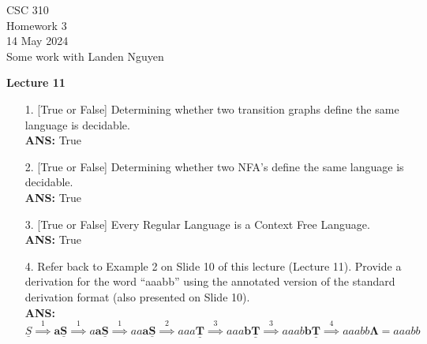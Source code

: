 \documentclass[letterpaper, 12 pt]{article}
\begin{document}
\begin{center}
    \Large CSC 310\\
    Homework 3\\
    \normalsize
    14 May 2024\\

    Some work with Landen Nguyen
\end{center}

\Large \textbf{Lecture 11}

\normalsize

\begin{enumerate}
    \item[1.] [True or False] Determining whether two transition graphs define
        the same language is decidable. \\
        \textbf{ANS:} True

    \item[2.] [True or False] Determining whether two NFA’s define the same
        language is decidable.\\
        \textbf{ANS:} True

    \item[3.] [True or False] Every Regular Language is a Context Free Language.
        \\
        \textbf{ANS:} True

    \item[4.] Refer back to Example 2 on Slide 10 of this lecture (Lecture 11).
        Provide a derivation for the word “aaabb” using the annotated version of
        the standard derivation format (also presented on Slide 10). \\
        \textbf{ANS:} \\
        $
        \underline{S} \overset{1}{\implies} \bm{a\underline{S}}
        \overset{1}{\implies} a\bm{a\underline{S}}
        \overset{1}{\implies} aa\bm{a\underline{S}}
        \overset{2}{\implies} aaa\bm{\underline{T}}
        \overset{3}{\implies} aaa\bm{b\underline{T}}
        \overset{3}{\implies} aaab\bm{b\underline{T}}
        \overset{4}{\implies} aaabb\bm{\Lambda} = aaabb
        $


\end{enumerate}
\end{document}
